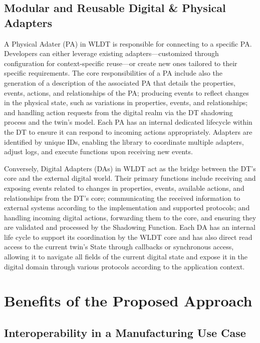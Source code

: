 \subsection{Modular and Reusable Digital \& Physical Adapters}
\label{subsec:adapters}

A Physical Adater (PA) in WLDT is responsible for connecting to a specific \ac{PA}. 
Developers can either leverage existing adapters—customized through configuration for context-specific reuse—or create new ones tailored to their specific requirements.
The core responsibilities of a PA include also the generation of a description of the associated \ac{PA} that details the properties, events, actions, and relationships of the \ac{PA}; producing events to reflect changes in the physical state, such as variations in properties, events, and relationships; and handling action requests from the digital realm via the DT shadowing process and the twin's model.
Each PA has an internal dedicated lifecycle within the DT to ensure it can respond to incoming actions appropriately. Adapters are identified by unique IDs, enabling the library to coordinate multiple adapters, adjust logs, and execute functions upon receiving new events. 

Conversely, Digital Adapters (DAs) in WLDT act as the bridge between the DT's core and the external digital world.
Their primary functions include receiving and exposing events related to changes in properties, events, available actions, and relationships from the DT’s core;
communicating the received information to external systems according to the implementation and supported protocols;
and handling incoming digital actions, forwarding them to the core, and ensuring they are validated and processed by the Shadowing Function.
Each DA has an internal life cycle to support its coordination by the WLDT core and has also direct read access to the current twin's State through callbacks or synchronous access, allowing it to navigate all fields of the current digital state and expose it in the digital domain through various protocols according to the application context.


\section{Benefits of the Proposed Approach}

\subsection{Interoperability in a Manufacturing Use Case}
\label{sec:industrial_use_case}

